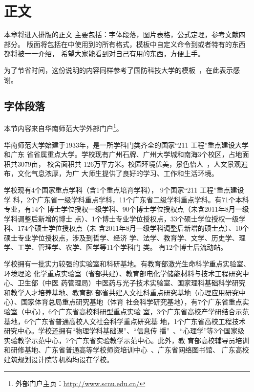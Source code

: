 \chapter{正文}
\label{chap:main}
本章将进入排版的正文
主要包括：字体段落，图片表格，公式定理，参考文献四部分。
版面将包括在\scnuthesis{}中使用到的所有格式，模板中自定义命令到或者特有的东西都将被一一介绍，
希望大家能看到对自己有用的东西，方便上手。

为了节省时间，这份说明的内容同样参考了国防科技大学的\nudtpaper{}模板~，在此表示感谢。

\section{字体段落}
\label{sec:font}

本节内容来自华南师范大学外部门户\footnote{外部门户主页：\url{http://www.scnu.edu.cn/}}。

华南师范大学始建于1933年，是一所学科门类齐全的国家“211 工程”重点建设大学和广东%
省省属重点大学。学校现有广州石牌、广州大学城和南海3个校区，占地面积共3079亩，%
校舍面积共 126万平方米。校园环境优美，景色怡人~，人文景观遍布，文化气息浓厚，为广%
大师生提供了良好的学习、工作和生活环境。

学校现有4个国家重点学科（含1个重点培育学科）， 9个国家“211 工程”重点建设学%
科，2个广东省一级学科重点学科，11个广东省二级学科重点学科。有71个本科专业，有14个%
博士学位授权一级学科、90个博士学位授权点（未含2011年8月一级学科调整后新增的博士%
点）、1个博士专业学位授权点，33个硕士学位授权一级学科、174个硕士学位授权点（未%
含2011年8月一级学科调整后新增的硕士点）、10个硕士专业学位授权点，涉及到哲学、经济%
学、法学、教育学、文学、历史学、理学、工学、管理学、农学、医学等11个学科门%
类。 有12个博士后流动站。

学校拥有一批实力较强的实验室和科研基地。有教育部激光生命科学重点实验室、环境理论
化学重点实验室（省部共建）、教育部电化学储能材料与技术工程研究中心、卫生部（中医
药管理局）中医药与光子技术实验室、国家理科基础科学研究和教学人才培养基地、教育部
部省共建人文社科重点研究基地（心理应用研究中心）、国家体育总局重点研究基地（体育
社会科学研究基地），有7个广东省重点实验室（中心），6个广东省高校科研型重点实验
室，3个广东省高校产学研结合示范基地，6个广东省普通高校人文社会科学重点研究基
地，1个广东省高校工程技术研究中心。学校还拥有“物理学科基础课”、“信息传
播”~、“心理学”等3个国家级实验教学示范中心，7个广东省实验教学示范中心。此外，教
育部高校辅导员培训和研修基地、广东省普通高等学校师资培训中心~、广东省网络图书馆、
广东高校建筑规划设计院等机构均设在学校。

